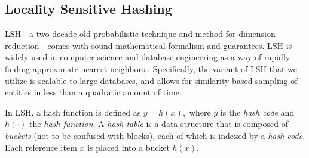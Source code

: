 \documentclass[aoas]{imsart}
\begin{document}
\subsection{Locality Sensitive Hashing}
LSH---a two-decade old probabilistic technique and method for dimension reduction---comes with sound mathematical formalism and guarantees. LSH is widely used in computer science and database engineering as a way of rapidly finding approximate nearest neighbors \citep{Proc:Indyk_STOC98,gionis_1999}. Specifically, the variant of LSH that we utilize is scalable to large databases, and allows for similarity based sampling of entities in less than a quadratic amount of time.

In LSH, a hash function is defined as $y = h(x),$ where $y$ is the \emph{hash code} and $h(\cdot)$ the \emph{hash function}. A \emph{hash table} is a data structure that is composed of \emph{buckets} (not to be confused with blocks), each of which is indexed by a \emph{hash code}. Each reference item $x$ is placed into a bucket $h(x).$
\end{document}
